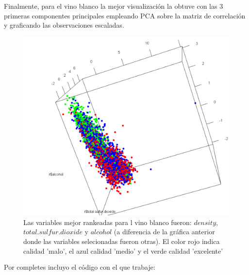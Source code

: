 \documentclass[paper=letter, fontsize=11pt]{scrartcl}
\numberwithin{equation}{section} %
\numberwithin{figure}{section} %
\numberwithin{table}{section} %
\begin{document}
Finalmente, para el vino blanco la mejor visualización la obtuve con las 3 primeras componentes principales empleando PCA sobre la matriz de correlación y graficando las observaciones escaladas.
\begin{figure}[H]
  \begin{center}
    \includegraphics[scale=.20]{final_vino_blanco_checarcodigo.PNG}
    \caption{Las variables mejor rankeadas para l vino blanco fueron: $density$, $total.sulfur.dioxide$ y $alcohol$ (a diferencia de la gráfica anterior donde las variables selecionadas fueron otras). El color rojo indica calidad 'malo', el azul calidad 'medio' y el verde calidad 'excelente'}
    \label{fig:separacion_vino_blanco}
  \end{center}
\end{figure}

Por completes incluyo el código con el que trabaje:\\
\end{document}

